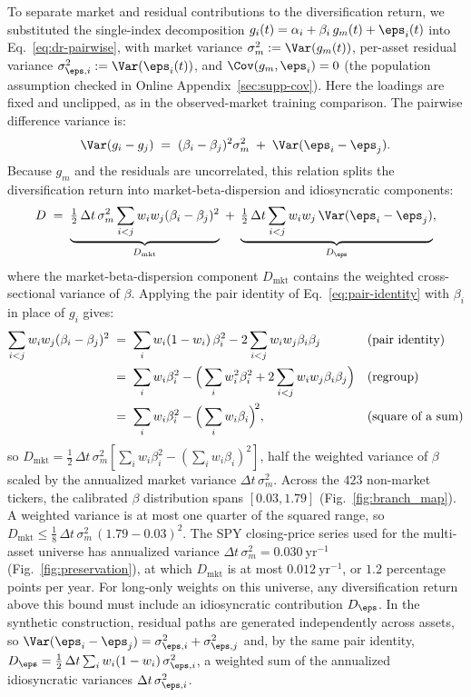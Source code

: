 To separate market and residual contributions to the diversification
return, we substituted the single-index decomposition
$g_i(t) = \alpha_i + \beta_i\, g_m(t) + \eps_i(t)$ into
Eq.~\eqref{eq:dr-pairwise}, with market variance
$\sigma_m^2 := \Var(g_m(t))$, per-asset residual variance
$\sigma_{\eps,i}^2 := \Var(\eps_i(t))$, and $\Cov(g_m, \eps_i) = 0$
(the population assumption checked in Online
Appendix~\ref{sec:supp-cov}). Here the loadings are fixed and
unclipped, as in the observed-market training comparison. The
pairwise difference variance is:
\begin{equation}
  \Var(g_i - g_j) \;=\; (\beta_i - \beta_j)^2 \sigma_m^2
  \;+\; \Var(\eps_i - \eps_j).
\end{equation}
Because $g_m$ and the residuals are uncorrelated, this relation splits
the diversification return into market-beta-dispersion and
idiosyncratic components:
\begin{equation}
  D \;=\;
  \underbrace{\tfrac{1}{2}\,\Delta t\,\sigma_m^2 \sum_{i<j} w_i w_j (\beta_i - \beta_j)^2}_{D_{\mathrm{mkt}}}
  \;+\;
  \underbrace{\tfrac{1}{2}\,\Delta t \sum_{i<j} w_i w_j \,\Var(\eps_i - \eps_j)}_{D_\eps},
  \label{eq:dr-sim}
\end{equation}
where the market-beta-dispersion component $D_\mathrm{mkt}$ contains
the weighted cross-sectional variance of $\beta$. Applying the pair
identity of Eq.~\eqref{eq:pair-identity} with $\beta_i$ in place of
$g_i$ gives:
\begin{align}
  \sum_{i<j} w_i w_j (\beta_i - \beta_j)^2
   &\;=\; \sum_i w_i (1 - w_i)\, \beta_i^2
     - 2 \sum_{i<j} w_i w_j \beta_i \beta_j
     && \text{(pair identity)} \notag \\
   &\;=\; \sum_i w_i \beta_i^2
     - \Big(\sum_i w_i^2 \beta_i^2
     + 2 \sum_{i<j} w_i w_j \beta_i \beta_j\Big)
     && \text{(regroup)} \notag \\
   &\;=\; \sum_i w_i \beta_i^2 - \Big(\sum_i w_i \beta_i\Big)^{\!2},
     && \text{(square of a sum)}
\end{align}
so $D_\mathrm{mkt} = \tfrac{1}{2}\,\Delta t\,\sigma_m^2 [\sum_i w_i
\beta_i^2 - (\sum_i w_i \beta_i)^2]$, half the weighted variance of $\beta$
scaled by the annualized market variance $\Delta t\,\sigma_m^2$.
Across the $423$ non-market tickers, the calibrated $\beta$
distribution spans $[0.03, 1.79]$ (Fig.~\ref{fig:branch_map}). A
weighted variance is at most one quarter of the squared range, so
$D_{\mathrm{mkt}} \le \tfrac{1}{8}\,\Delta t\,\sigma_m^2\,(1.79 -
0.03)^2$. The SPY closing-price series used for the multi-asset
universe has annualized variance $\Delta t\,\sigma_m^2 =
0.030~\mathrm{yr}^{-1}$ (Fig.~\ref{fig:preservation}), at which
$D_{\mathrm{mkt}}$ is at most $0.012~\mathrm{yr}^{-1}$, or $1.2$
percentage points per year. For long-only weights on this universe, any diversification return
above this bound must include an idiosyncratic contribution $D_\eps$. In the synthetic construction, residual paths are
generated independently across assets, so
$\Var(\eps_i - \eps_j) = \sigma_{\eps,i}^2 + \sigma_{\eps,j}^2$ and,
by the same pair identity,
$D_\eps = \tfrac{1}{2}\,\Delta t \sum_i w_i (1 - w_i)\,
\sigma_{\eps,i}^2$, a weighted sum of the annualized idiosyncratic
variances $\Delta t\,\sigma_{\eps,i}^2$.

